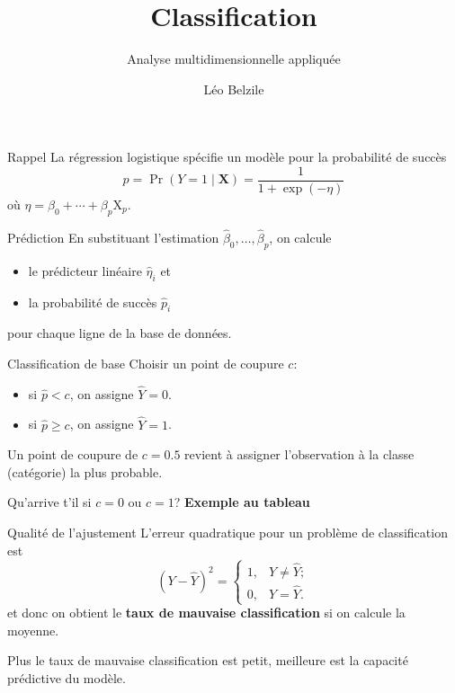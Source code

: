 \documentclass[
  ignorenonframetext,
]{beamer}
\title{Classification}
\subtitle{Analyse multidimensionnelle appliquée}
\author{Léo Belzile}
\date{}
\institute{HEC Montréal}
\providecommand{\tightlist}{%
  \setlength{\itemsep}{0pt}\setlength{\parskip}{0pt}}\usepackage{longtable,booktabs,array}
\begin{document}
\frame{\titlepage}
\ifdefined\Shaded\renewenvironment{Shaded}{\begin{tcolorbox}[interior hidden, breakable, enhanced, frame hidden, borderline west={3pt}{0pt}{shadecolor}, sharp corners, boxrule=0pt]}{\end{tcolorbox}}\fi

\begin{frame}{Rappel}
\protect\hypertarget{rappel}{}
La régression logistique spécifie un modèle pour la probabilité de
succès \[p = \Pr(Y=1 \mid \mathbf{X}) = \frac{1}{1+\exp(-\eta)}\] où
\(\eta = \beta_0 + \cdots + \beta_p \mathrm{X}_p\).
\end{frame}

\begin{frame}{Prédiction}
\protect\hypertarget{pruxe9diction}{}
En substituant l'estimation
\(\widehat{\beta}_0, \ldots, \widehat{\beta}_p\), on calcule

\begin{itemize}
\tightlist
\item
  le prédicteur linéaire \(\widehat{\eta}_i\) et
\item
  la probabilité de succès \(\widehat{p}_i\)
\end{itemize}

pour chaque ligne de la base de données.
\end{frame}

\begin{frame}{Classification de base}
\protect\hypertarget{classification-de-base}{}
Choisir un point de coupure \(c\):

\begin{itemize}
\tightlist
\item
  si \(\widehat{p} < c\), on assigne \(\widehat{Y}=0\).
\item
  si \(\widehat{p} \geq c\), on assigne \(\widehat{Y}=1\).
\end{itemize}

Un point de coupure de \(c=0.5\) revient à assigner l'observation à la
classe (catégorie) la plus probable.

Qu'arrive t'il si \(c=0\) ou \(c=1\)? \textbf{Exemple au tableau}
\end{frame}

\begin{frame}{Qualité de l'ajustement}
\protect\hypertarget{qualituxe9-de-lajustement}{}
L'erreur quadratique pour un problème de classification est
\[(Y-\widehat{Y})^2 = \begin{cases} 1, & Y \neq \widehat{Y}; \\0, & Y = \widehat{Y}.\end{cases}\]
et donc on obtient le \textbf{taux de mauvaise classification} si on
calcule la moyenne.

Plus le taux de mauvaise classification est petit, meilleure est la
capacité prédictive du modèle.
\end{frame}
\end{document}
